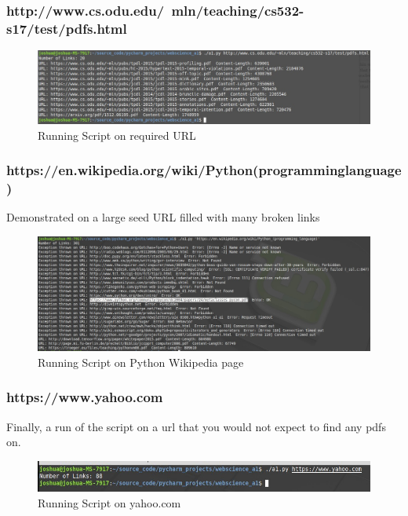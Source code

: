 \documentclass[11pt]{article}
\begin{document}
		\subsubsection{http://www.cs.odu.edu/~mln/teaching/cs532-s17/test/pdfs.html}
		\begin{figure}[H]
			\includegraphics[scale=0.4]{resources/mln.jpg}
			\caption{Running Script on required URL}
		\end{figure}
		
		\newpage 
		\subsubsection{https://en.wikipedia.org/wiki/Python\textunderscore(programming\textunderscore language)}
		Demonstrated on a large seed URL filled with many broken links
		\begin{figure}[H]
			\includegraphics[scale=0.4]{resources/python.jpg}
			\caption{Running Script on Python Wikipedia page}
		\end{figure}
		\subsubsection{https://www.yahoo.com}
		Finally, a run of the script on a url that you would not expect to find any pdfs on. 
		\begin{figure}[H]
			\includegraphics[scale=0.4]{resources/yahoo.jpg}
			\caption{Running Script on yahoo.com}
		\end{figure}
		
	
			
\end{document}
